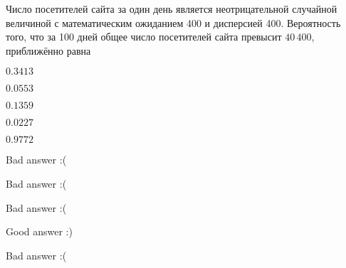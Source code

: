 
\begin{question}
Число посетителей сайта за один день является неотрицательной случайной
величиной с математическим ожиданием 400 и дисперсией 400. Вероятность
того, что за 100 дней общее число посетителей сайта превысит
\(40\,400\), приближённо равна
\begin{answerlist}
  \item \(0.3413\)
  \item \(0.0553\)
  \item \(0.1359\)
  \item \(0.0227\)
  \item \(0.9772\)
\end{answerlist}
\end{question}

\begin{solution}
\begin{answerlist}
  \item Bad answer :(
  \item Bad answer :(
  \item Bad answer :(
  \item Good answer :)
  \item Bad answer :(
\end{answerlist}
\end{solution}

